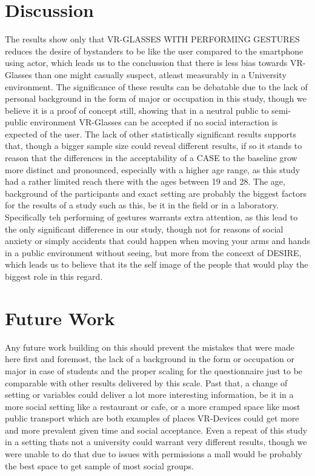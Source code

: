\documentclass[sigchi]{acmart}
\begin{document}
\section {Discussion}
The results show only that VR-GLASSES WITH PERFORMING GESTURES reduces the desire of bystanders to be like the user compared to the smartphone using actor, which leads us to the conclussion that there is less bias towards VR-Glasses than one might casually suspect, atleast measurably in a University environment. The significance of these results can be debatable due to the lack of personal background in the form of major or occupation in this study, though we believe it is a proof of concept still, showing that in a neutral public to semi-public environment VR-Glasses can be accepted if no social interaction is expected of the user. The lack of other statistically significant results supports that, though a bigger sample size could reveal different results, if so it stands to reason that the differences in the acceptability of a CASE to the baseline grow more distinct and pronounced, especially with a higher age range, as this study had a rather limited reach there with the ages between 19 and 28. The age, background of the participants and exact setting are probably the biggest factors for the results of a study such as this, be it in the field or in a laboratory. 
Specifically teh performing of gestures warrants extra attention, as this lead to the only significant difference in our study, though not for reasons of social anxiety or simply accidents that could happen when moving your arms and hands in a public environment without seeing, but more from the concext of DESIRE, which leads us to believe that its the self image of the people that would play the biggest role in this regard.

\section {Future Work}
Any future work building on this should prevent the mistakes that were made here first and foremost, the lack of a background in the form or occupation or major in case of students and the proper scaling for the questionnaire just to be comparable with other results delivered by this scale. Past that, a change of setting or variables could deliver a lot more interesting information, be it in a more social setting like a restaurant or cafe, or a more cramped space like most public transport which are both examples of places VR-Devices could get more and more prevalent given time and social acceptance.  Even a repeat of this study in a setting thats not a university could warrant very different results, though we were unable to do that due to issues with permissions a mall would be probably the best space to get sample of most social groups.




\appendix
\listoffigures
\end{document}
